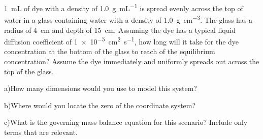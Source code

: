 \documentclass{homework}
\begin{document}
\maketitle

\begin{homeworkProblem}
 
\SI{1}{\milli\liter} of dye with a density of \SI{1.0}{\gram\per\milli\liter} is spread evenly across the top of water in a glass containing water with a density of \SI{1.0}{\gram\per\cubic\centi\meter}.  The glass has a radius of \SI{4}{\centi\meter} and depth of \SI{15}{\centi\meter}.  Assuming the dye has a typical liquid diffusion coefficient of \SI{1e-5}{\centi\meter\squared\per\second}, how long will it take for the dye concentration at the bottom of the glass to reach  of the equilibrium concentration?  Assume the dye immediately and uniformly spreads out across the top of the glass.

\begin{homeworkSection}{a)}{How many dimensions would you use to model this system?}


\end{homeworkSection}

\begin{homeworkSection}{b)}{Where would you locate the zero of the coordinate system?}


\end{homeworkSection}

\begin{homeworkSection}{c)}{What is the governing mass balance equation for this scenario? Include only terms that are relevant.}

\end{homeworkSection}
\end{homeworkProblem}
\end{document}
